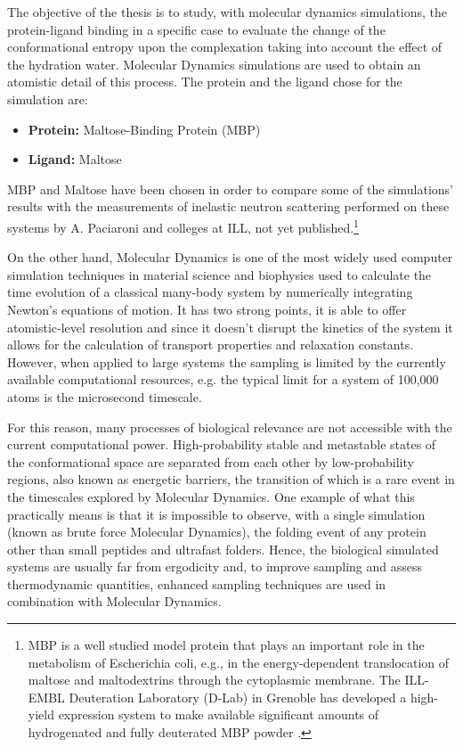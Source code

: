 The objective of the thesis is to study, with molecular dynamics simulations, the protein-ligand binding in a specific case to evaluate the change of the conformational entropy upon the complexation taking into account the effect of the hydration water. Molecular Dynamics simulations are used to obtain an atomistic detail of this process.
The protein and the ligand chose for the simulation are:
\begin{center}
\begin{minipage}{0.7\textwidth}
\begin{itemize}
\item[] \textbf{Protein:} Maltose-Binding Protein (MBP)
\vspace{-0.2cm}
\item[] \textbf{Ligand:} Maltose
\end{itemize}
\end{minipage}
\end{center}
MBP and Maltose have been chosen in order to compare some of the simulations' results with the measurements of inelastic neutron scattering performed on these systems by A. Paciaroni and colleges at ILL, not yet published.\footnote{MBP is a well studied model protein that plays an important role in the metabolism of Escherichia coli, e.g., in the energy-dependent translocation of maltose and maltodextrins through the cytoplasmic membrane. The ILL-EMBL Deuteration Laboratory (D-Lab) in Grenoble has developed a high-yield expression system to make available significant amounts of hydrogenated and fully deuterated MBP powder
\cite{paciaroni2008fingerprints}.}

On the other hand, Molecular Dynamics is one of the most widely used computer simulation techniques in material science and biophysics used to calculate the time evolution of a classical many-body system by numerically integrating Newton's equations of motion. It has two strong points, it is able to offer atomistic-level resolution and since it doesn't disrupt the kinetics of the system it allows for the calculation of transport properties and relaxation constants. However, when applied to large systems the sampling is limited by the currently available computational resources, e.g. the typical limit for a system of 100,000 atoms is the microsecond timescale. 

For this reason, many processes of biological relevance are not accessible with the current computational power. High-probability stable and metastable states of the conformational space are separated from each other by low-probability regions, also known as energetic barriers, the transition of which is a rare event in the timescales explored by Molecular Dynamics. One example of what this practically means is that it is impossible to observe, with a single simulation (known as brute force Molecular Dynamics), the folding event of any protein other than small peptides and ultrafast folders. Hence, the biological simulated systems are usually far from ergodicity and, to improve sampling and assess thermodynamic quantities, enhanced sampling techniques are used in combination with Molecular Dynamics.\cite{kalimeri}



